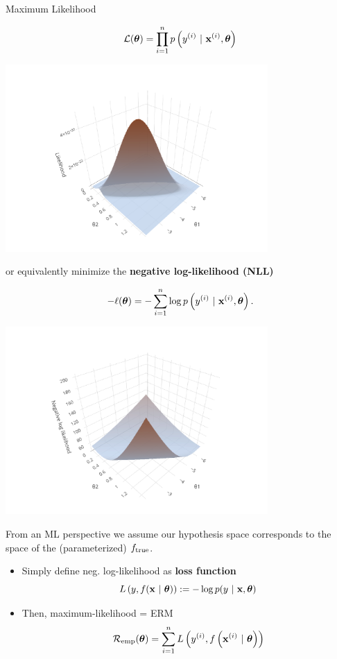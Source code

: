 \documentclass[11pt,compress,t,notes=noshow, xcolor=table]{beamer}
\begin{document}
\begin{vbframe}{Maximum Likelihood}
\begin{itemize}
\begin{minipage}{0.5\textwidth}
$$ \mathcal{L}(\bm{\theta}) = \prod_{i=1}^n p\left(y^{(i)} ~|~\mathbf{x}^{(i)}, \bm{\theta}\right) $$
\end{minipage}%
\begin{minipage}{0.5\textwidth}
\includegraphics[width = 0.75\textwidth]{figure/log_reg_ml.pdf}
\end{minipage}

or equivalently minimize the \textbf{negative log-likelihood (NLL)}

\begin{minipage}{0.5\textwidth}
$$ -\ell(\bm{\theta}) = -\sum\limits_{i=1}^n \log p\left(y^{(i)} ~|~\mathbf{x}^{(i)}, \bm{\theta}\right). $$
\end{minipage}%
\begin{minipage}{0.5\textwidth}
\includegraphics[width = 0.75\textwidth]{figure/log_reg_erm.pdf}
\end{minipage}
\end{itemize}


\framebreak 

From an ML perspective we assume our hypothesis space corresponds to the space of the (parameterized) $f_{\text{true}}$. 

\begin{itemize}
\item Simply define neg. log-likelihood as \textbf{loss function} 
$$ L\left(y, f(\mathbf{x} ~|~ \bm{\theta})\right) := - \log p(y ~|~\mathbf{x}, \bm{\theta}) $$
\item Then, maximum-likelihood 
 = ERM
$$\mathcal{R}_{\text{emp}}(\bm{\theta}) = \sum\limits_{i=1}^n L\left(y^{(i)}, f\left(\mathbf{x}^{(i)} ~|~ \bm{\theta}\right)\right)$$


\end{itemize}
\end{vbframe}
\end{document}
